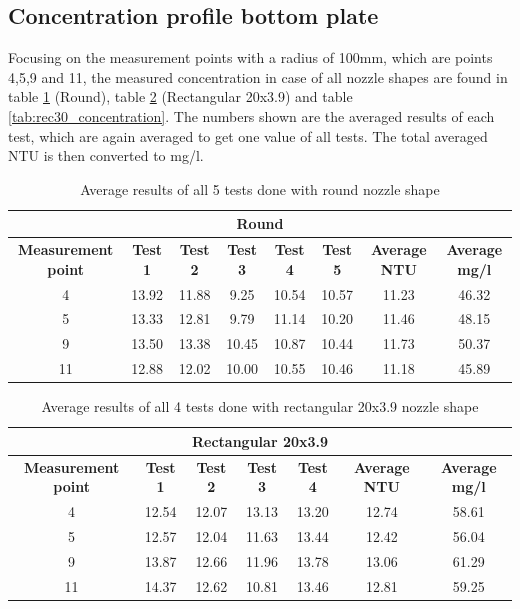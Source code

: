 \subsection{Concentration profile bottom plate}

Focusing on the measurement points with a radius of 100mm, which are points 4,5,9 and 11, the measured concentration in case of all nozzle shapes are found in table \ref{tab:round_concentration} (Round), table \ref{tab:rec20_concentration} (Rectangular 20x3.9) and table \ref{tab:rec30_concentration}. The numbers shown are the averaged results of each test, which are again averaged to get one value of all tests. The total averaged NTU is then converted to mg/l.


\begin{table}[ht!]
\centering
\begin{tabular}{|c|c|c|c|c|c|c|c|}
\hline
\multicolumn{8}{|c|}{\textbf{Round}} \\ \hline
\textbf{Measurement point} & \textbf{Test 1} & \textbf{Test 2} & \textbf{Test 3} & \textbf{Test 4} & \textbf{Test 5} & \textbf{Average NTU} & \textbf{Average mg/l} \\ \hline
4 & 13.92 & 11.88 & 9.25 & 10.54 & 10.57 & 11.23 & 46.32 \\ \hline
5 & 13.33 & 12.81 & 9.79 & 11.14 & 10.20 & 11.46 & 48.15 \\ \hline
9 & 13.50 & 13.38 & 10.45 & 10.87 & 10.44 & 11.73 & 50.37 \\ \hline
11 & 12.88 & 12.02 & 10.00 & 10.55 & 10.46 & 11.18 & 45.89 \\ \hline
\end{tabular}
\caption{Average results of all 5 tests done with round nozzle shape}
\label{tab:round_concentration}
\end{table}

\begin{table}[ht!]
\centering
\begin{tabular}{|c|c|c|c|c|c|c|}
\hline
\multicolumn{7}{|c|}{\textbf{Rectangular 20x3.9}} \\ \hline
\textbf{Measurement point} & \textbf{Test 1} & \textbf{Test 2} & \textbf{Test 3} & \textbf{Test 4} & \textbf{Average NTU} & \textbf{Average mg/l} \\ \hline
4 & 12.54 & 12.07 & 13.13 & 13.20 & 12.74 & 58.61 \\ \hline
5 & 12.57 & 12.04 & 11.63 & 13.44 & 12.42 & 56.04 \\ \hline
9 & 13.87 & 12.66 & 11.96 & 13.78 & 13.06 & 61.29 \\ \hline
11 & 14.37 & 12.62 & 10.81 & 13.46 & 12.81 & 59.25 \\ \hline
\end{tabular}
\caption{Average results of all 4 tests done with rectangular 20x3.9 nozzle shape}
\label{tab:rec20_concentration}
\end{table}


